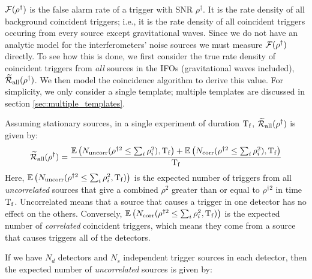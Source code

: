 $\mathcal{F}(\rho^\dagger)$ is the false alarm rate of a trigger with \ac{SNR} $\rho^\dagger$. It is the rate density of all background coincident triggers; i.e., it is the rate density of all coincident triggers occuring from every source except gravitational waves. Since we do not have an analytic model for the interferometers' noise sources we must measure $\mathcal{F}(\rho^\dagger)$ directly. To see how this is done, we first consider the true rate density of coincident triggers from \emph{all} sources in the \acp{IFO} (gravitational waves included), $\widetilde{\mathcal{R}}_\mathrm{all}(\rho^\dagger)$. We then model the coincidence algorithm to derive this value. For simplicity, we only consider a single template; multiple templates are discussed in section \ref{sec:multiple_templates}.

Assuming stationary sources, in a single experiment of duration $\mathrm{T_f}$, $\widetilde{\mathcal{R}}_\mathrm{all}(\rho^\dagger)$ is given by:
\begin{equation}
\label{eqn:rate_param}
\widetilde{\mathcal{R}}_{\mathrm{all}}(\rho^\dagger) = \frac{\mathbb{E}\left(N_{\mathrm{uncorr}}(\rho^{\dagger2} \leq \sum_i\rho_i^2),\mathrm{T_f}\right) + \mathbb{E}\left(N_{\mathrm{corr}}(\rho^{\dagger2} \leq \sum_i\rho_i^2),\mathrm{T_f}\right)}{\mathrm{T_f}}
\end{equation}
Here, $\mathbb{E}\left(N_{\mathrm{uncorr}}(\rho^{\dagger2} \leq \sum_i\rho_i^2, \mathrm{T_f})\right)$ is the expected number of triggers from all \emph{uncorrelated} sources that give a combined $\rho^2$ greater than or equal to $\rho^{\dagger2}$ in time $\mathrm{T_f}$. Uncorrelated means that a source that causes a trigger in one detector has no effect on the others. Conversely, $\mathbb{E}\left(N_{\mathrm{corr}}(\rho^{\dagger2} \leq \sum_i\rho_i^2, \mathrm{T_f})\right)$ is the expected number of \emph{correlated} coincident triggers, which means they come from a source that causes triggers all of the detectors.

If we have $N_d$ detectors and $N_s$ independent trigger sources in each detector, then the expected number of \emph{uncorrelated} sources is given by:

